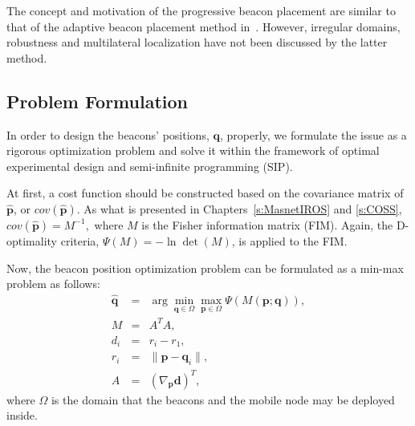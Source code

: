 The concept and motivation of the progressive beacon placement are similar to that of the adaptive beacon placement method in~\cite{bulusu01adaptive}. However, irregular domains, robustness and multilateral localization have not been discussed by the latter method.
\subsection{Problem Formulation}
In order to design the beacons' positions, $\mathbf{q}$, properly, we formulate the issue as a rigorous optimization problem and solve it within the framework of optimal experimental design and semi-infinite programming (SIP).


At first, a cost function should be constructed based on the covariance matrix of $\mathbf{\hat{p}}$, or $cov(\mathbf{\hat{p}})$. As what is presented in Chapters~\ref{s:MasnetIROS} and \ref{s:COSS}, $cov(\mathbf{\hat{p}})=M^{-1},$ where $M$ is the Fisher information matrix (FIM). Again, the D-optimality criteria, $\Psi(M)=-\ln\det(M)$, is applied to the FIM.


Now, the beacon position optimization problem can be formulated as a min-max problem as follows:
\begin{eqnarray}
  \hat{\mathbf{q}} &=& \arg\min_{\mathbf{q}\in\Omega}\max_{\mathbf{p}\in\Omega} \Psi(M(\mathbf{p}; \mathbf{q})),\label{e:beaconPlac} \\
  M &=& A^T A,\label{e:bplocFIM} \\
  d_i &=& r_i - r_1,\nonumber \\
  r_i &=& \| \mathbf{p} - \mathbf{q}_i \|,\nonumber \\
  A &=& (\nabla_{\mathbf{p}} \mathbf{d})^T,\nonumber
\end{eqnarray}
where $\Omega$ is the domain that the beacons and the mobile node may be deployed inside.

